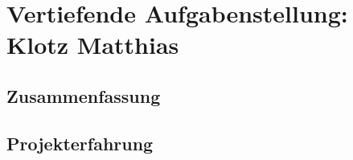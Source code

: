 \chapter[Klotz]{Vertiefende Aufgabenstellung: Klotz Matthias}

\section{Zusammenfassung}

\section{Projekterfahrung}